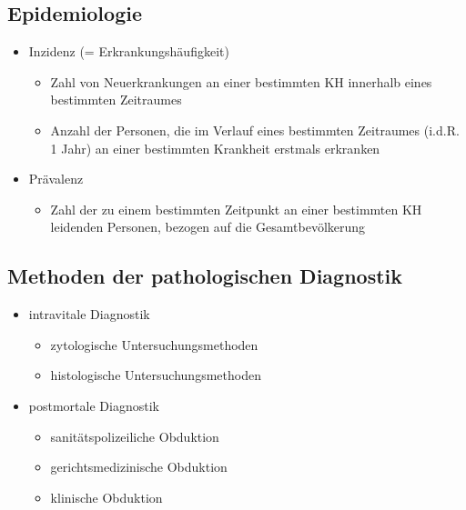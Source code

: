 \begin{it>emize}
\subsection{Epidemiologie}
	\begin{itemize}
		\item Inzidenz (= Erkrankungshäufigkeit)
			\begin{itemize}
				\item Zahl von Neuerkrankungen an einer bestimmten KH innerhalb eines bestimmten Zeitraumes
				\item Anzahl der Personen, die im Verlauf eines bestimmten Zeitraumes (i.d.R. 1 Jahr) an einer bestimmten Krankheit erstmals erkranken
			\end{itemize}
		\item Prävalenz
			\begin{itemize}
				\item Zahl der zu einem bestimmten Zeitpunkt an einer bestimmten KH leidenden Personen, bezogen auf die Gesamtbevölkerung
			\end{itemize}
	\end{itemize}

\subsection{Methoden der pathologischen Diagnostik}
	\begin{itemize}
		\item intravitale Diagnostik
			\begin{itemize}
				\item zytologische Untersuchungsmethoden
				\item histologische Untersuchungsmethoden
			\end{itemize}
		\item postmortale Diagnostik
			\begin{itemize}
				\item sanitätspolizeiliche Obduktion
				\item gerichtsmedizinische Obduktion
				\item klinische Obduktion
			\end{itemize}
	\end{itemize}


\end{it>emize}
